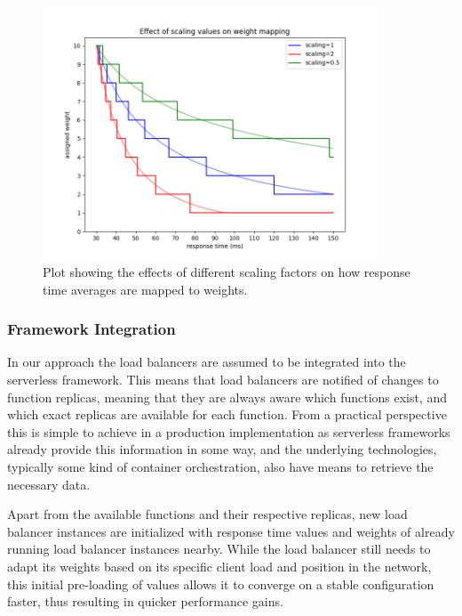 \documentclass[draft,final]{vutinfth} %
\begin{document}
\begin{figure}
    \centering
    \includegraphics[width=10cm]{graphics/graphs/weight_mapping_scaling_example.png}
    \caption{Plot showing the effects of different scaling factors on how response time averages are mapped to weights.}
    \label{fig:weight_mapping_example}
\end{figure}


\subsubsection{Framework Integration}
In our approach the load balancers are assumed to be integrated into the serverless framework.
This means that load balancers are notified of changes to function replicas, meaning that they are always aware which functions exist, and which exact replicas are available for each function.
From a practical perspective this is simple to achieve in a production implementation as serverless frameworks already provide this information in some way, and the underlying technologies, typically some kind of container orchestration, also have means to retrieve the necessary data.

Apart from the available functions and their respective replicas, new load balancer instances are initialized with response time values and weights of already running load balancer instances nearby.
While the load balancer still needs to adapt its weights based on its specific client load and position in the network, this initial pre-loading of values allows it to converge on a stable configuration faster, thus resulting in quicker performance gains.



\end{document}
